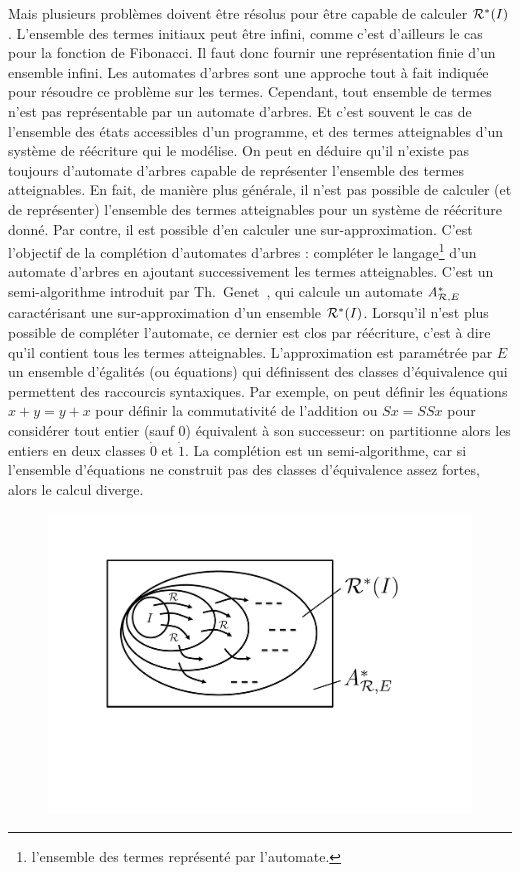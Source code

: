 Mais plusieurs problèmes doivent être résolus pour être capable de
calculer $\mathcal R^*(I)$.  L'ensemble des termes initiaux peut être infini,
comme c'est d'ailleurs le cas pour la fonction de Fibonacci.  Il faut
donc fournir une représentation finie d'un ensemble infini.  Les
automates d'arbres sont une approche tout à fait indiquée pour
résoudre ce problème sur les termes.  Cependant, tout ensemble de
termes n'est pas représentable par un automate d'arbres.  Et c'est
souvent le cas de l'ensemble des états accessibles d'un programme, et
des termes atteignables d'un système de réécriture qui le
modélise. On peut en déduire qu'il n'existe pas toujours d'automate
d'arbres capable de représenter l'ensemble des termes
atteignables. En fait, de manière plus générale, il n'est pas possible
de calculer (et de représenter) l'ensemble des termes atteignables
pour un système de réécriture donné.  Par contre, il est possible d'en
calculer une sur-approximation.  C'est l'objectif de la complétion
d'automates d'arbres : compléter le langage\footnote{\footnotesize
  l'ensemble des termes représenté par l'automate.} d'un automate
d'arbres en ajoutant successivement les termes atteignables.  C'est un
semi-algorithme introduit par Th.~Genet~\cite{Genet-RTA98}, qui
calcule un automate $\mathit A^*_{\mathcal R,E}$ caractérisant une sur-approximation
d'un ensemble $\mathcal R^*(I)$.  Lorsqu'il n'est plus possible de compléter
l'automate, ce dernier est clos par réécriture, c'est à dire qu'il
contient tous les termes atteignables.  L'approximation est paramétrée
par $E$ un ensemble d'égalités (ou équations) qui définissent des
classes d'équivalence qui permettent des raccourcis syntaxiques.  Par
exemple, on peut définir les équations $x + y = y + x$ pour définir la
commutativité de l'addition ou $Sx = SSx$ pour considérer tout entier
(sauf $0$) équivalent à son successeur: on partitionne alors les
entiers en deux classes $\dot{0}$ et $\dot{1}$.  La complétion est un
semi-algorithme, car si l'ensemble d'équations ne construit pas des
classes d'équivalence assez fortes, alors le calcul diverge.

\begin{figure}[ht!]
  \centering
  \includegraphics[width=12cm]{1_intro/approx}
\end{figure}

